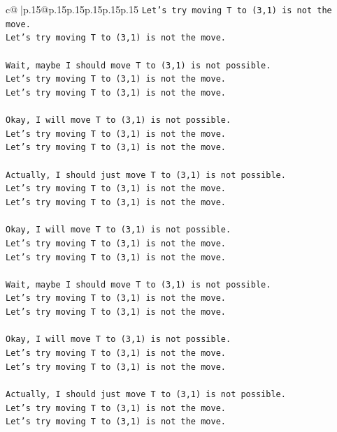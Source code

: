 \documentclass{article}
\begin{document}
{\begin{supertabular}{c@{$\;$}|p{.15\linewidth}@{}p{.15\linewidth}p{.15\linewidth}p{.15\linewidth}p{.15\linewidth}p{.15\linewidth}}
{{{\texttt{Let's try moving T to (3,1) is not the move.} \\
\texttt{Let's try moving T to (3,1) is not the move.} \\
\\ 
\texttt{Wait, maybe I should move T to (3,1) is not possible.} \\
\texttt{Let's try moving T to (3,1) is not the move.} \\
\texttt{Let's try moving T to (3,1) is not the move.} \\
\\ 
\texttt{Okay, I will move T to (3,1) is not possible.} \\
\texttt{Let's try moving T to (3,1) is not the move.} \\
\texttt{Let's try moving T to (3,1) is not the move.} \\
\\ 
\texttt{Actually, I should just move T to (3,1) is not possible.} \\
\texttt{Let's try moving T to (3,1) is not the move.} \\
\texttt{Let's try moving T to (3,1) is not the move.} \\
\\ 
\texttt{Okay, I will move T to (3,1) is not possible.} \\
\texttt{Let's try moving T to (3,1) is not the move.} \\
\texttt{Let's try moving T to (3,1) is not the move.} \\
\\ 
\texttt{Wait, maybe I should move T to (3,1) is not possible.} \\
\texttt{Let's try moving T to (3,1) is not the move.} \\
\texttt{Let's try moving T to (3,1) is not the move.} \\
\\ 
\texttt{Okay, I will move T to (3,1) is not possible.} \\
\texttt{Let's try moving T to (3,1) is not the move.} \\
\texttt{Let's try moving T to (3,1) is not the move.} \\
\\ 
\texttt{Actually, I should just move T to (3,1) is not possible.} \\
\texttt{Let's try moving T to (3,1) is not the move.} \\
\texttt{Let's try moving T to (3,1) is not the move.} \\
\\ 
}}}
\end{supertabular}}
\end{document}
